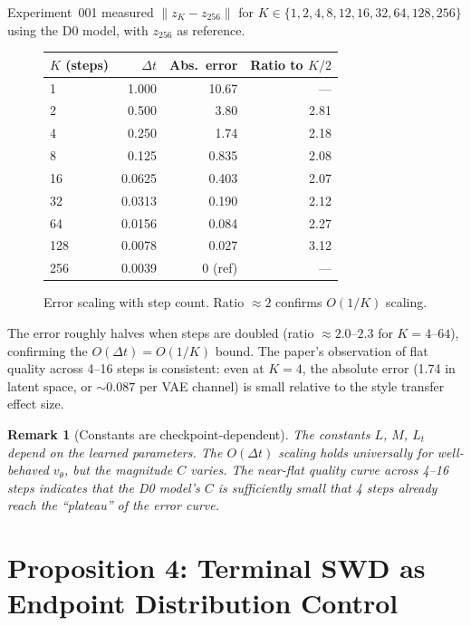 \documentclass[letterpaper]{article}
\newtheorem{remark}[proposition]{Remark}
\begin{document}
Experiment~001 measured $\|z_K - z_{256}\|$ for $K\in\{1,2,4,8,12,16,32,64,128,256\}$
using the D0 model, with $z_{256}$ as reference.

\begin{figure}[h]
\centering
\begin{tabular}{lrrr}
\toprule
$K$ (steps) & $\Delta t$ & Abs.\ error & Ratio to $K/2$ \\
\midrule
1 & 1.000 & 10.67 & --- \\
2 & 0.500 & 3.80 & 2.81 \\
4 & 0.250 & 1.74 & 2.18 \\
8 & 0.125 & 0.835 & 2.08 \\
16 & 0.0625 & 0.403 & 2.07 \\
32 & 0.0313 & 0.190 & 2.12 \\
64 & 0.0156 & 0.084 & 2.27 \\
128 & 0.0078 & 0.027 & 3.12 \\
256 & 0.0039 & 0 (ref) & --- \\
\bottomrule
\end{tabular}
\caption{Error scaling with step count. Ratio $\approx 2$ confirms $O(1/K)$ scaling.}
\label{fig:step_error}
\end{figure}

The error roughly halves when steps are doubled (ratio $\approx 2.0$--$2.3$
for $K=4$--$64$), confirming the $O(\Delta t) = O(1/K)$ bound.
The paper's observation of flat quality across 4--16 steps is consistent:
even at $K=4$, the absolute error (1.74 in latent space, or $\sim 0.087$
per VAE channel) is small relative to the style transfer effect size.

\begin{remark}[Constants are checkpoint-dependent]
The constants $L$, $M$, $L_t$ depend on the learned parameters. The
$O(\Delta t)$ scaling holds universally for well-behaved $v_\theta$,
but the magnitude $C$ varies. The near-flat quality curve across
4--16 steps indicates that the D0 model's $C$ is sufficiently small
that 4 steps already reach the ``plateau'' of the error curve.
\end{remark}


\section{Proposition 4: Terminal SWD as Endpoint Distribution Control}
\end{document}
